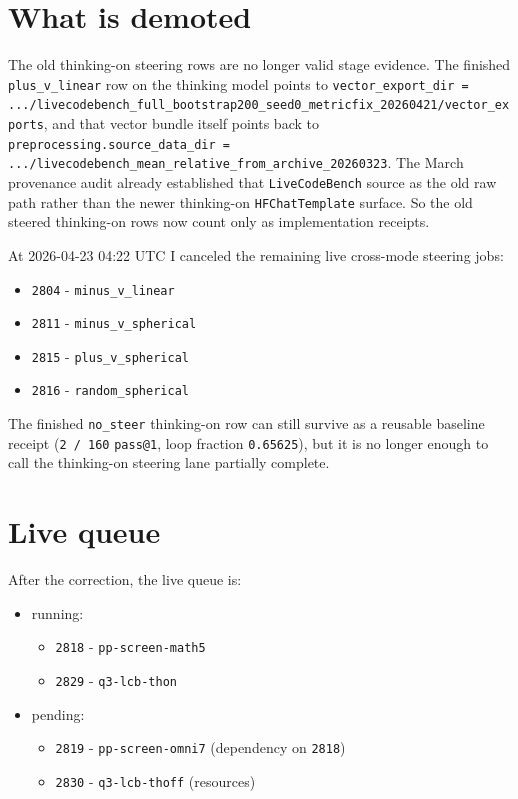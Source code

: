 \documentclass[11pt]{article}
\begin{document}
\section*{What is demoted}
The old thinking-on steering rows are no longer valid stage evidence. The finished \texttt{plus\_v\_linear} row on the thinking model points to \texttt{vector\_export\_dir = .../livecodebench\_full\_bootstrap200\_seed0\_metricfix\_20260421/vector\_exports}, and that vector bundle itself points back to \texttt{preprocessing.source\_data\_dir = .../livecodebench\_mean\_relative\_from\_archive\_20260323}. The March provenance audit already established that \texttt{LiveCodeBench} source as the old raw path rather than the newer thinking-on \texttt{HFChatTemplate} surface. So the old steered thinking-on rows now count only as implementation receipts.

At 2026-04-23 04:22 UTC I canceled the remaining live cross-mode steering jobs:
\begin{itemize}
\item \texttt{2804} - \texttt{minus\_v\_linear}
\item \texttt{2811} - \texttt{minus\_v\_spherical}
\item \texttt{2815} - \texttt{plus\_v\_spherical}
\item \texttt{2816} - \texttt{random\_spherical}
\end{itemize}

The finished \texttt{no\_steer} thinking-on row can still survive as a reusable baseline receipt (\texttt{2 / 160} \texttt{pass@1}, loop fraction \texttt{0.65625}), but it is no longer enough to call the thinking-on steering lane partially complete.

\section*{Live queue}
After the correction, the live queue is:
\begin{itemize}
\item running:
  \begin{itemize}
  \item \texttt{2818} - \texttt{pp-screen-math5}
  \item \texttt{2829} - \texttt{q3-lcb-thon}
  \end{itemize}
\item pending:
  \begin{itemize}
  \item \texttt{2819} - \texttt{pp-screen-omni7} (dependency on \texttt{2818})
  \item \texttt{2830} - \texttt{q3-lcb-thoff} (resources)
  \end{itemize}
\end{itemize}
\end{document}
